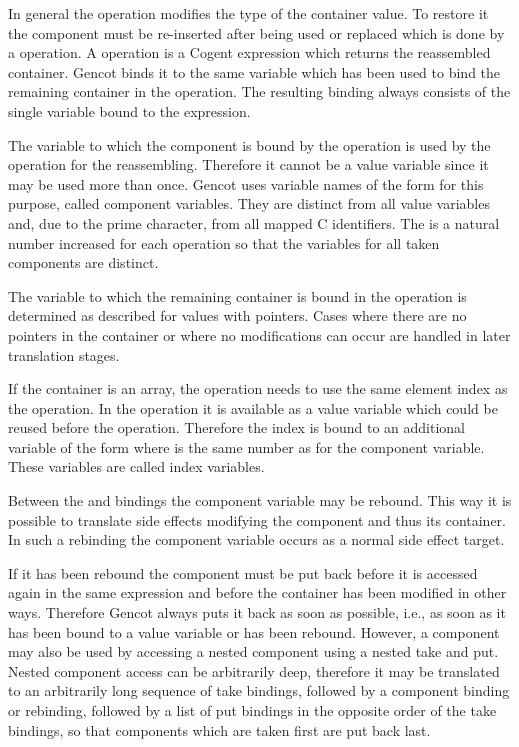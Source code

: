 In general the  operation modifies the type of the container value. To restore it the component must 
be re-inserted after being used or replaced which is done by a  operation. A  operation is a Cogent
expression which returns the reassembled container. Gencot binds it to the same variable which has been used 
to bind the remaining container in the  operation. The resulting binding always consists of the single
variable bound to the  expression.

The variable to which the component is bound by the  operation is used by the  operation for the 
reassembling. Therefore it cannot be a value variable since it may be used more than once. Gencot uses variable names 
of the form  for this purpose, called component variables. They are distinct from all value variables and, 
due to the prime character, from all mapped C identifiers. The  is a natural number increased for each 
operation so that the variables for all taken components are distinct.

The variable to which the remaining container is bound in the  operation is determined as described for values 
with pointers. Cases where there are no pointers in the container or where no modifications can occur are handled in later
translation stages.

If the container is an array, the  operation needs to use the same element index as the  operation. 
In the  operation it is available as a value variable which could be reused before the  operation.
Therefore the index is bound to an additional variable of the form  where  is the same number as for 
the component variable. These variables are called index variables.

Between the  and  bindings the component variable may be rebound. This way it is possible to translate
side effects modifying the component and thus its container. In such a rebinding the component variable occurs as a normal side
effect target.

If it has been rebound the component must be put back before it is accessed again in the same expression and before the container
has been modified in other ways. Therefore Gencot always
puts it back as soon as possible, i.e., as soon as it has been bound to a value variable or has been rebound. However, a component
may also be used by accessing a nested component using a nested take and put. Nested component access can be arbitrarily deep,
therefore it may be translated to an arbitrarily long sequence of take bindings, followed by a component binding or rebinding,
followed by a list of put bindings in the opposite order of the take bindings, so that components which are taken
first are put back last.

